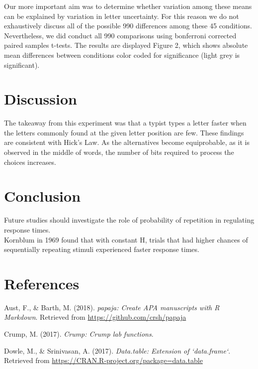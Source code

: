 \documentclass[man]{apa6}
\theoremstyle{definition}
\theoremstyle{definition}
\theoremstyle{definition}
\theoremstyle{remark}
\begin{document}
Our more important aim was to determine whether variation among these
means can be explained by variation in letter uncertainty. For this
reason we do not exhaustively discuss all of the possible 990
differences among these 45 conditions. Nevertheless, we did conduct all
990 comparisons using bonferroni corrected paired samples t-tests. The
results are displayed Figure 2, which shows absolute mean differences
between conditions color coded for significance (light grey is
significant).

\section{Discussion}\label{discussion}

The takeaway from this experiment was that a typist types a letter
faster when the letters commonly found at the given letter position are
few. These findings are consistent with Hick's Law. As the alternatives
become equiprobable, as it is observed in the middle of words, the
number of bits required to process the choices increases.

\section{Conclusion}\label{conclusion}

Future studies should investigate the role of probability of repetition
in regulating response times.\\
Kornblum in 1969 found that with constant H, trials that had higher
chances of sequentially repeating stimuli experienced faster response
times.

\newpage

\section{References}\label{references}

\begingroup
\setlength{\parindent}{-0.5in} \setlength{\leftskip}{0.5in}

\hypertarget{refs}{}
\hypertarget{ref-R-papaja}{}
Aust, F., \& Barth, M. (2018). \emph{papaja: Create APA manuscripts with
R Markdown}. Retrieved from \url{https://github.com/crsh/papaja}

\hypertarget{ref-R-Crump}{}
Crump, M. (2017). \emph{Crump: Crump lab functions}.

\hypertarget{ref-R-data.table}{}
Dowle, M., \& Srinivasan, A. (2017). \emph{Data.table: Extension of
`data.frame`}. Retrieved from
\url{https://CRAN.R-project.org/package=data.table}
\end{document}
